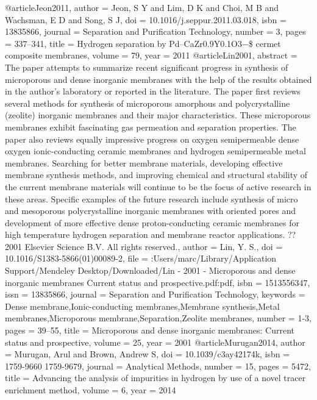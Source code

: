 @article{Jeon2011,
author = {Jeon, S Y and Lim, D K and Choi, M B and Wachsman, E D and Song, S J},
doi = {10.1016/j.seppur.2011.03.018},
isbn = {13835866},
journal = {Separation and Purification Technology},
number = {3},
pages = {337--341},
title = {{Hydrogen separation by Pd–CaZr0.9Y0.1O3−{\$}\delta{\$} cermet composite membranes}},
volume = {79},
year = {2011}
}
@article{Lin2001,
abstract = {The paper attempts to summarize recent significant progress in synthesis of microporous and dense inorganic membranes with the help of the results obtained in the author's laboratory or reported in the literature. The paper first reviews several methods for synthesis of microporous amorphous and polycrystalline (zeolite) inorganic membranes and their major characteristics. These microporous membranes exhibit fascinating gas permeation and separation properties. The paper also reviews equally impressive progress on oxygen semipermeable dense oxygen ionic-conducting ceramic membranes and hydrogen semipermeable metal membranes. Searching for better membrane materials, developing effective membrane synthesis methods, and improving chemical and structural stability of the current membrane materials will continue to be the focus of active research in these areas. Specific examples of the future research include synthesis of micro and mesoporous polycrystalline inorganic membranes with oriented pores and development of more effective dense proton-conducting ceramic membranes for high temperature hydrogen separation and membrane reactor applications. ?? 2001 Elsevier Science B.V. All rights reserved.},
author = {Lin, Y. S.},
doi = {10.1016/S1383-5866(01)00089-2},
file = {:Users/marc/Library/Application Support/Mendeley Desktop/Downloaded/Lin - 2001 - Microporous and dense inorganic membranes Current status and prospective.pdf:pdf},
isbn = {1513556347},
issn = {13835866},
journal = {Separation and Purification Technology},
keywords = {Dense membrane,Ionic-conducting membranes,Membrane synthesis,Metal membranes,Microporous membrane,Separation,Zeolite membranes},
number = {1-3},
pages = {39--55},
title = {{Microporous and dense inorganic membranes: Current status and prospective}},
volume = {25},
year = {2001}
}
@article{Murugan2014,
author = {Murugan, Arul and Brown, Andrew S},
doi = {10.1039/c3ay42174k},
isbn = {1759-9660
1759-9679},
journal = {Analytical Methods},
number = {15},
pages = {5472},
title = {{Advancing the analysis of impurities in hydrogen by use of a novel tracer enrichment method}},
volume = {6},
year = {2014}
}

